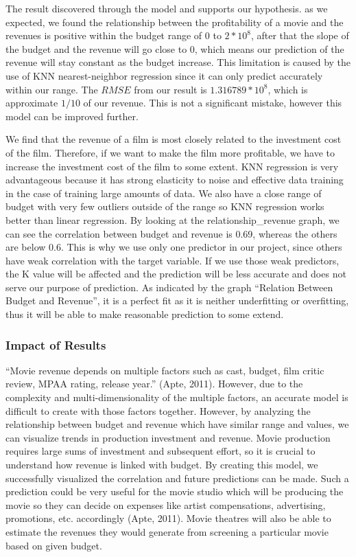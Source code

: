 \documentclass[
]{article}
\begin{document}
The result discovered through the model and supports our hypothesis. as
we expected, we found the relationship between the profitability of a
movie and the revenues is positive within the budget range of \(0\) to
\(2*10^8\), after that the slope of the budget and the revenue will go
close to 0, which means our prediction of the revenue will stay constant
as the budget increase. This limitation is caused by the use of KNN
nearest-neighbor regression since it can only predict accurately within
our range. The \(RMSE\) from our result is \(1.316789*10^8\), which is
approximate \(1/10\) of our revenue. This is not a significant mistake,
however this model can be improved further.

We find that the revenue of a film is most closely related to the
investment cost of the film. Therefore, if we want to make the film more
profitable, we have to increase the investment cost of the film to some
extent. KNN regression is very advantageous because it has strong
elasticity to noise and effective data training in the case of training
large amounts of data. We also have a close range of budget with very
few outliers outside of the range so KNN regression works better than
linear regression. By looking at the relationship\_revenue graph, we can
see the correlation between budget and revenue is 0.69, whereas the
others are below 0.6. This is why we use only one predictor in our
project, since others have weak correlation with the target variable. If
we use those weak predictors, the K value will be affected and the
prediction will be less accurate and does not serve our purpose of
prediction. As indicated by the graph ``Relation Between Budget and
Revenue'', it is a perfect fit as it is neither underfitting or
overfitting, thus it will be able to make reasonable prediction to some
extend.

\hypertarget{impact-of-results}{%
\subsubsection{Impact of Results}\label{impact-of-results}}

``Movie revenue depends on multiple factors such as cast, budget, film
critic review, MPAA rating, release year.'' (Apte, 2011). However, due
to the complexity and multi-dimensionality of the multiple factors, an
accurate model is difficult to create with those factors together.
However, by analyzing the relationship between budget and revenue which
have similar range and values, we can visualize trends in production
investment and revenue. Movie production requires large sums of
investment and subsequent effort, so it is crucial to understand how
revenue is linked with budget. By creating this model, we successfully
visualized the correlation and future predictions can be made. Such a
prediction could be very useful for the movie studio which will be
producing the movie so they can decide on expenses like artist
compensations, advertising, promotions, etc. accordingly (Apte, 2011).
Movie theatres will also be able to estimate the revenues they would
generate from screening a particular movie based on given budget.
\end{document}
